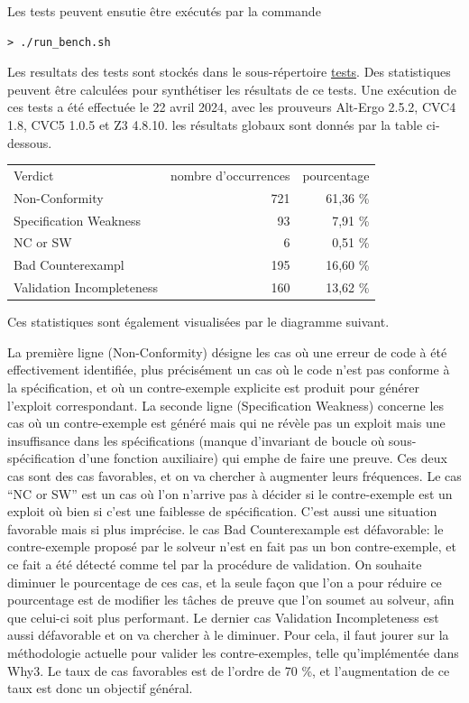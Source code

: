 \documentclass[a4paper,11pt]{article}
\begin{document}
Les tests peuvent ensutie être exécutés par la commande
\begin{lstlisting}
> ./run_bench.sh
\end{lstlisting}
Les resultats des tests sont stockés dans le sous-répertoire
\url{tests}. Des statistiques peuvent être calculées pour synthétiser
les résultats de ce tests. Une exécution de ces tests a été effectuée
le 22 avril 2024, avec les prouveurs Alt-Ergo 2.5.2, CVC4 1.8, CVC5
1.0.5 et Z3 4.8.10. les résultats globaux sont donnés par la table ci-dessous.
  \begin{center}
  \begin{tabular}{|l|r|r|}
  \rowcolor{gray!50} Verdict
  & \multicolumn{1}{p{0.13\textwidth}|}{nombre d'occurrences}
  & \multicolumn{1}{p{0.13\textwidth}|}{pourcentage}
  \\
Non-Conformity         & 721 & 61,36 \% \\
Specification Weakness & 93 & 7,91 \% \\
    NC or SW  	       & 6 & 0,51 \% \\
Bad Counterexampl & 195 & 16,60 \% \\
    Validation Incompleteness & 160 & 13,62 \%
  \end{tabular}
\end{center}
Ces statistiques sont également visualisées par le diagramme
  suivant.
  \begin{center}
\end{center}
La première ligne (Non-Conformity) désigne les cas où une erreur de
code à été effectivement identifiée, plus précisément un cas où le
code n'est pas conforme à la spécification, et où un contre-exemple
explicite est produit pour générer l'exploit correspondant. La seconde
ligne (Specification Weakness) concerne les cas où un contre-exemple
est généré mais qui ne révèle pas un exploit mais une insuffisance
dans les spécifications (manque d'invariant de boucle où
sous-spécification d'une fonction auxiliaire) qui emphe de faire une
preuve. Ces deux cas sont des cas favorables, et on va chercher à
augmenter leurs fréquences. Le cas ``NC or SW'' est un cas où l'on
n'arrive pas à décider si le contre-exemple est un exploit où bien si
c'est une faiblesse de spécification. C'est aussi une situation
favorable mais si plus imprécise. le cas Bad Counterexample est
défavorable: le contre-exemple proposé par le solveur n'est en fait
pas un bon contre-exemple, et ce fait a été détecté comme tel par la
procédure de validation. On souhaite diminuer le pourcentage de ces
cas, et la seule façon que l'on a pour réduire ce pourcentage est de
modifier les tâches de preuve que l'on soumet au solveur, afin que
celui-ci soit plus performant. Le dernier cas Validation
Incompleteness est aussi défavorable et on va chercher à le
diminuer. Pour cela, il faut jourer sur la méthodologie actuelle pour
valider les contre-exemples, telle qu'implémentée dans Why3.  Le taux
de cas favorables est de l'ordre de 70 \%, et l'augmentation de ce
taux est donc un objectif général.
\end{document}
